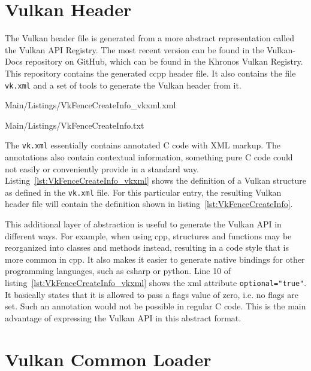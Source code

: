   \section{Vulkan Header}
  \label{sec:VulkanHeader}
    The Vulkan header file is generated from a more abstract representation called the Vulkan API Registry.
    The most recent version can be found in the Vulkan-Docs repository on GitHub, which can be found in the Khronos Vulkan Registry\cite{vulkanregistry}.
    This repository contains the generated \gls{ccpp} header file.
    It also contains the file \lstinline{vk.xml} and a set of tools to generate the Vulkan header from it.

    
    {Main/Listings/VkFenceCreateInfo_vkxml.xml}

    
    {Main/Listings/VkFenceCreateInfo.txt}

    The \lstinline{vk.xml} essentially contains annotated C code with XML markup.
    The annotations also contain contextual information, something pure C code could not easily or conveniently provide in a standard way.
    Listing~\ref{lst:VkFenceCreateInfo_vkxml} shows the definition of a Vulkan structure as defined in the \lstinline{vk.xml} file.
    For this particular entry, the resulting Vulkan header file will contain the definition shown in listing~\ref{lst:VkFenceCreateInfo}.

    This additional layer of abstraction is useful to generate the Vulkan API in different ways.
    For example, when using \gls{cpp}, structures and functions may be reorganized into classes and methods instead, resulting in a code style that is more common in \gls{cpp}.
    It also makes it easier to generate native bindings for other programming languages, such as \gls{csharp} or \gls{python}.
    Line 10 of listing~\ref{lst:VkFenceCreateInfo_vkxml} shows the xml attribute \lstinline{optional="true"}.
    It basically states that it is allowed to pass a flags value of zero, i.e. no flags are set.
    Such an annotation would not be possible in regular C code.
    This is the main advantage of expressing the Vulkan API in this abstract format.


  \section{Vulkan Common Loader}
  \label{sec:VulkanLoader}


